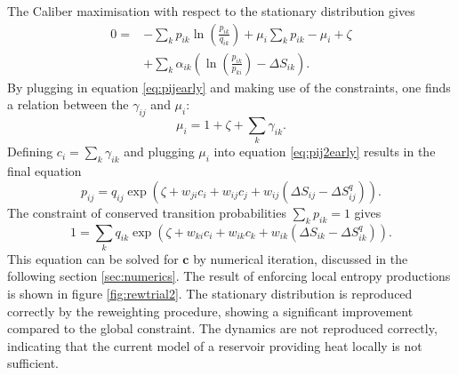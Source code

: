 The Caliber maximisation with respect to the stationary distribution gives
  \begin{equation}
    \begin{aligned}
      0 =& -\sum_k p_{ik} \ln \left ( \frac{p_{ik}}{q_{ik}}  \right ) + \mu_i \sum_k p_{ik} - \mu_i  +\zeta  \\
      &+ \sum_{k} \alpha_{ik} \left( \ln \left ( \frac{p_{ik}}{p_{ki}} 
\right) - \Delta S_{ik}  \right  ) .
    \end{aligned}
  \end{equation}
  By plugging in equation \ref{eq:pijearly} and making use of the constraints, one finds a relation between the $\gamma_{ij}$ and $\mu_i$:
  \begin{equation}
    \mu_i  = 1 + \zeta + \sum_k \gamma_{ik}.
  \end{equation}
Defining $c_i = \sum_k \gamma_{ik} $ and plugging $\mu_i$ into equation \ref{eq:pij2early}
 results in the final equation
 \begin{equation}
 p_{ij} = q_{ij} \exp \left ( \zeta + w_{ji} c_i + w_{ij} c_j + w_{ij} (\Delta S_{ij} -\Delta S_{ij}^q)  \right ).
 \label{eq:altpij}
 \end{equation}  
The constraint of conserved transition probabilities $\sum_k p_{ik} =1 $ gives
 \begin{equation}
 1 = \sum_k q_{ik} \exp \left ( \zeta + w_{ki} c_i + w_{ik} c_k + w_{ik} (\Delta S_{ik} -\Delta S_{ik}^q)  \right ).
 \end{equation}
 This equation can be solved for $\bm{c}$ by  numerical iteration, discussed in the following section \ref{sec:numerics}.
 The result of enforcing local entropy productions is shown in figure \ref{fig:rewtrial2}. The stationary distribution is reproduced correctly by the reweighting procedure, showing a significant improvement compared to the global constraint. The dynamics are not reproduced correctly, indicating that the current model of a reservoir providing heat locally is not sufficient. 
 
